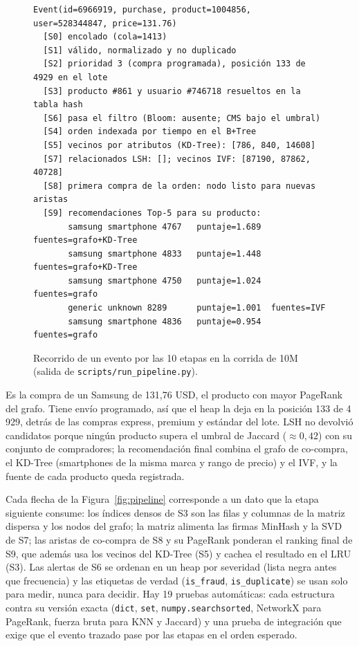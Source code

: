 \documentclass[11pt,letterpaper]{article}
\begin{document}
\begin{figure}[!htbp]
\begin{Verbatim}[fontsize=\footnotesize,frame=single,framesep=6pt,rulecolor=\color{black!30}]
Event(id=6966919, purchase, product=1004856, user=528344847, price=131.76)
  [S0] encolado (cola=1413)
  [S1] válido, normalizado y no duplicado
  [S2] prioridad 3 (compra programada), posición 133 de 4929 en el lote
  [S3] producto #861 y usuario #746718 resueltos en la tabla hash
  [S6] pasa el filtro (Bloom: ausente; CMS bajo el umbral)
  [S4] orden indexada por tiempo en el B+Tree
  [S5] vecinos por atributos (KD-Tree): [786, 840, 14608]
  [S7] relacionados LSH: []; vecinos IVF: [87190, 87862, 40728]
  [S8] primera compra de la orden: nodo listo para nuevas aristas
  [S9] recomendaciones Top-5 para su producto:
       samsung smartphone 4767   puntaje=1.689  fuentes=grafo+KD-Tree
       samsung smartphone 4833   puntaje=1.448  fuentes=grafo+KD-Tree
       samsung smartphone 4750   puntaje=1.024  fuentes=grafo
       generic unknown 8289      puntaje=1.001  fuentes=IVF
       samsung smartphone 4836   puntaje=0.954  fuentes=grafo
\end{Verbatim}
\caption{Recorrido de un evento por las 10 etapas en la corrida de 10M (salida de \texttt{scripts/run\_pipeline.py}).}
\label{fig:traza}
\end{figure}

Es la compra de un Samsung de 131{,}76 USD, el producto con mayor PageRank del grafo. Tiene envío programado, así que el heap la deja en la posición 133 de 4\,929, detrás de las compras express, premium y estándar del lote. LSH no devolvió candidatos porque ningún producto supera el umbral de Jaccard ($\approx 0{,}42$) con su conjunto de compradores; la recomendación final combina el grafo de co-compra, el KD-Tree (smartphones de la misma marca y rango de precio) y el IVF, y la fuente de cada producto queda registrada.

Cada flecha de la Figura~\ref{fig:pipeline} corresponde a un dato que la etapa siguiente consume: los índices densos de S3 son las filas y columnas de la matriz dispersa y los nodos del grafo; la matriz alimenta las firmas MinHash y la SVD de S7; las aristas de co-compra de S8 y su PageRank ponderan el ranking final de S9, que además usa los vecinos del KD-Tree (S5) y cachea el resultado en el LRU (S3). Las alertas de S6 se ordenan en un heap por severidad (lista negra antes que frecuencia) y las etiquetas de verdad (\texttt{is\_fraud}, \texttt{is\_duplicate}) se usan solo para medir, nunca para decidir. Hay 19 pruebas automáticas: cada estructura contra su versión exacta (\texttt{dict}, \texttt{set}, \texttt{numpy.searchsorted}, NetworkX para PageRank, fuerza bruta para KNN y Jaccard) y una prueba de integración que exige que el evento trazado pase por las etapas en el orden esperado.
\end{document}
